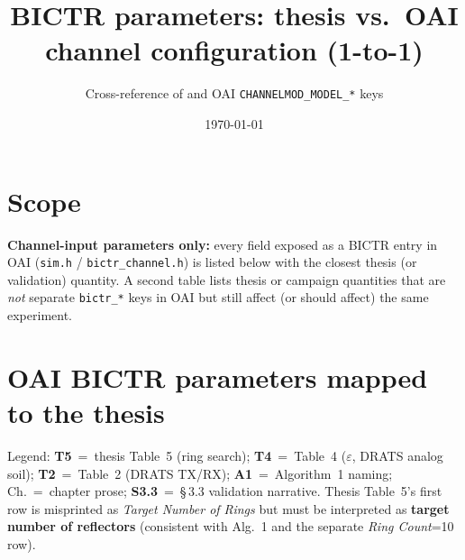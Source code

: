 \documentclass[11pt,a4paper]{article}
\title{BICTR parameters: thesis vs.\ OAI channel configuration (1-to-1)}
\author{Cross-reference of \thedoc{} and OAI \texttt{CHANNELMOD\_MODEL\_*} keys}
\date{\today}
\begin{document}
\setlength{\LTleft}{0pt}
\setlength{\LTright}{0pt}
\maketitle

\section*{Scope}
\textbf{Channel-input parameters only:} every field exposed as a BICTR entry in OAI
(\texttt{sim.h} / \texttt{bictr\_channel.h}) is listed below with the closest thesis (or
validation) quantity. A second table lists thesis or campaign quantities that are \emph{not}
separate \texttt{bictr\_*} keys in OAI but still affect (or should affect) the same experiment.

\section{OAI BICTR parameters mapped to the thesis}
\noindent
Legend: \textbf{T5}~=~thesis Table~5 (ring search); \textbf{T4}~=~Table~4 ($\varepsilon$, DRATS analog soil);
\textbf{T2}~=~Table~2 (DRATS TX/RX); \textbf{A1}~=~Algorithm~1 naming; Ch.~=~chapter prose;
\textbf{S3.3}~=~\S\,3.3 validation narrative. Thesis Table~5's first row is misprinted as
\textit{Target Number of Rings} but must be interpreted as \textbf{target number of
reflectors} (consistent with Alg.~1 and the separate \textit{Ring Count}=10 row).
\end{document}

